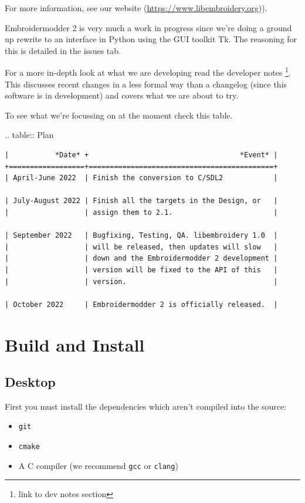 \documentclass[10pt]{report}
\begin{document}
For more information, see our website (\url{https://www.libembroidery.org})).

Embroidermodder 2 is very much a work in progress since we're doing a ground up
rewrite to an interface in Python using the GUI toolkit Tk. The reasoning for
this is detailed in the issues tab.

For a more in-depth look at what we are developing read the developer notes
\footnote{link to dev notes section}. This discusses recent changes in a less
formal way than a changelog (since this software is in development) and covers
what we are about to try.

To see what we're focussing on at the moment check this table.

.. table:: Plan

\begin{lstlisting}
|           *Date* +                                    *Event* |
+==================+============================================+
| April-June 2022  | Finish the conversion to C/SDL2            |

| July-August 2022 | Finish all the targets in the Design, or   |
|                  | assign them to 2.1.                        |

| September 2022   | Bugfixing, Testing, QA. libembroidery 1.0  |
|                  | will be released, then updates will slow   |
|                  | down and the Embroidermodder 2 development |
|                  | version will be fixed to the API of this   |
|                  | version.                                   |

| October 2022     | Embroidermodder 2 is officially released.  |
\end{lstlisting}

\section{Build and Install}

\subsection{Desktop}

First you must install the dependencies which aren't compiled into the source:

\begin{itemize}
\item \texttt{git}
\item \texttt{cmake}
\item A C compiler (we recommend \texttt{gcc} or \texttt{clang})
\end{itemize}
\end{document}
